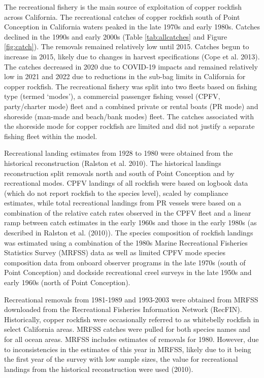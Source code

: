 \documentclass[11pt,
  english,
  letterpaper,
]{article}
\begin{document}
The recreational fishery is the main source of exploitation of copper rockfish across California. The recreational catches of copper rockfish south of Point Conception in California waters peaked in the late 1970s and early 1980s. Catches declined in the 1990s and early 2000s (Table \ref{tab:allcatches} and Figure \ref{fig:catch}). The removals remained relatively low until 2015. Catches begun to increase in 2015, likely due to changes in harvest specifications (Cope et al. 2013). The catches decreased in 2020 due to COVID-19 impacts and remained relatively low in 2021 and 2022 due to reductions in the sub-bag limits in California for copper rockfish. The recreational fishery was split into two fleets based on fishing type (termed `modes'), a commercial passenger fishing vessel (CPFV, party/charter mode) fleet and a combined private or rental boats (PR mode) and shoreside (man-made and beach/bank modes) fleet. The catches associated with the shoreside mode for copper rockfish are limited and did not justify a separate fishing fleet within the model.

Recreational landing estimates from 1928 to 1980 were obtained from the historical reconstruction (Ralston et al. 2010). The historical landings reconstruction split removals north and south of Point Conception and by recreational modes. CPFV landings of all rockfish were based on logbook data (which do not report rockfish to the species level), scaled by compliance estimates, while total recreational landings from PR vessels were based on a combination of the relative catch rates observed in the CPFV fleet and a linear ramp between catch estimates in the early 1960s and those in the early 1980s (as described in Ralston et al. (2010)). The species composition of rockfish landings was estimated using a combination of the 1980s Marine Recreational Fisheries Statistics Survey (MRFSS) data as well as limited CPFV mode species composition data from onboard observer programs in the late 1970s (south of Point Conception) and dockside recreational creel surveys in the late 1950s and early 1960s (north of Point Conception).

Recreational removals from 1981-1989 and 1993-2003 were obtained from MRFSS downloaded from the Recreational Fisheries Information Network (RecFIN). Historically, copper rockfish were occasionally referred to as whitebelly rockfish in select California areas. MRFSS catches were pulled for both species names and for all ocean areas. MRFSS includes estimates of removals for 1980. However, due to inconsistencies in the estimates of this year in MRFSS, likely due to it being the first year of the survey with low sample sizes, the value for recreational landings from the historical reconstruction were used (2010).
\end{document}
